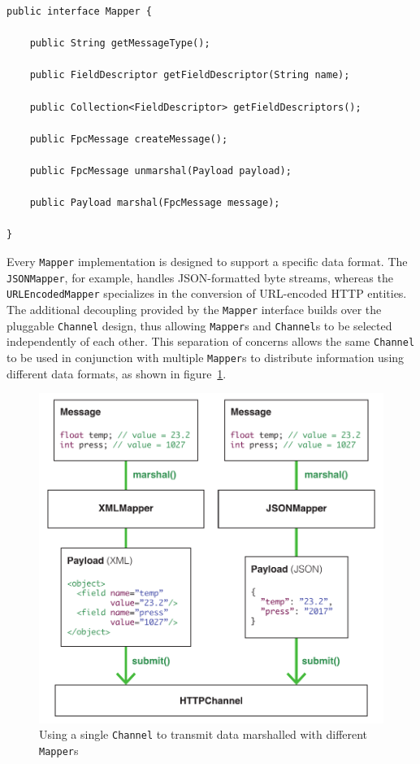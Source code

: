 \lstset{language=Java}
\begin{lstlisting}[float,floatplacement=!hbt,caption=The Mapper
interface,label={lst:mapper}]
public interface Mapper {

    public String getMessageType();

    public FieldDescriptor getFieldDescriptor(String name);

    public Collection<FieldDescriptor> getFieldDescriptors();

    public FpcMessage createMessage();

    public FpcMessage unmarshal(Payload payload);

    public Payload marshal(FpcMessage message);

}
\end{lstlisting}

Every \texttt{Mapper} implementation is designed to support a specific data
format. The \texttt{JSONMapper}, for example, handles JSON-formatted byte
streams, whereas the \texttt{URLEncodedMapper} specializes in the conversion of
URL-encoded HTTP entities. The additional decoupling provided by the
\texttt{Mapper} interface builds over the pluggable \texttt{Channel} design,
thus allowing \texttt{Mapper}s and \texttt{Channel}s to be selected
independently of each other. This separation of concerns allows the same
\texttt{Channel} to be used in conjunction with multiple \texttt{Mapper}s to
distribute information using different data formats, as shown in
figure~\ref{fig:mapper_channel}.

\begin{figure}[h!]
    \centering
    \includegraphics[scale=0.8]{imgs/mapper_channel.pdf}
    \caption{Using a single \texttt{Channel} to transmit data marshalled with
    different \texttt{Mapper}s}
    \label{fig:mapper_channel}
\end{figure}

